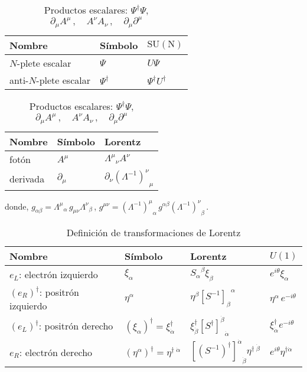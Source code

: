 \begin{frame}

\begin{table}
  \centering
   \begin{tabular}{lll}
    Nombre & Símbolo & $\operatorname{SU(N)}$ \\\hline
    $N$-plete escalar & $\Psi$ & $U \Psi$ \\
    anti-$N$-plete escalar & $\Psi^\dagger $ & $\Psi^\dagger U^\dagger $ \\\hline
    \end{tabular}\hspace{3cm}
   \begin{tabular}{lll}
    Nombre & Símbolo & Lorentz \\\hline
    fotón & $A^\mu$ & ${\Lambda^\mu}_\nu A^\nu$ \\
    derivada & $\partial_\mu$ & $\partial_\nu {\left(\Lambda^{-1}\right)^\nu}_\mu$ \\\hline
  \end{tabular}
  \caption{
       Productos escalares: $\Psi^\dagger \Psi$,  \hspace{4cm}
       $\partial_\mu A^{\mu}\,,\quad A^\nu A_\nu \,,\quad \partial_\mu  \partial^\mu$
}
  \label{tab:fermionlr}
\end{table}
donde,
 $g_{\alpha\beta}={\Lambda^{\mu}}_{\alpha}\,g_{\mu\nu}{\Lambda^{\nu}}_{\beta}\,$,
  $g^{\mu\nu}={\left( \Lambda^{-1} \right)^{\mu}}_{\alpha}\,g^{\alpha\beta} {\left( \Lambda^{-1} \right)^{\nu}}_{\beta}\,$.


\begin{table}
  \centering
  \begin{tabular}{llll}
    Nombre & Símbolo & Lorentz & $U(1)$\\\hline\hline
    $e_L$: electrón izquierdo & $\xi_{\alpha}$ & ${S_{\alpha}}^{\beta}\xi_{\beta}$ & $e^{i\theta}\xi_\alpha$\\
   $\left( e_R \right)^{\dagger}$: positrón izquierdo&$\eta^{\alpha}$& $\eta^\beta{\left[  S^{-1}  \right]_{\beta}}^{\alpha}$ & $\eta^\alpha\, e^{-i\theta}$\\
    \hline    
    $\left( e_L \right)^{\dagger}$: positrón derecho   & $\left( \xi_{\alpha} \right)^{\dagger}=\xi^{\dagger}_{\dot{\alpha}}$ &
     $\xi^{\dagger}_{\dot{\beta}}{\left[{S^{\dagger}}\right]^{\dot{\beta}}}_{\dot{\alpha}}$ & $\xi^\dagger_{\dot{\alpha}} e^{-i\theta}$\\
   $e_R$: electrón derecho   & $\left( \eta^{\alpha} \right)^{\dagger}=\eta^{\dagger\;\dot{\alpha}}$ & ${\left[ \left( S^{-1} \right)^\dagger \right]^{\dot{\alpha}}}_{\dot{\beta}}\eta^{\dagger\;\dot{\beta}}$& $e^{i\theta}\eta^{\dagger\dot{\alpha}}$ \\\hline\hline
  \end{tabular}
  \caption{Definición de transformaciones de Lorentz}
  \label{tab:fermionlr}
\end{table}


\end{frame}
